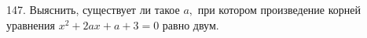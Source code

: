 147. Выяснить, существует ли такое $a,$ при котором произведение корней уравнения $x^2+2ax+a+3=0$ равно двум.
\newpage
